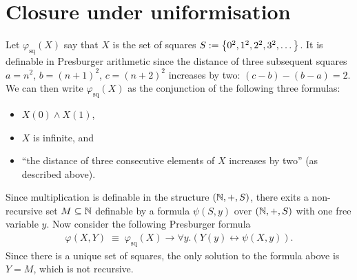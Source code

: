 
\section*{Closure under uniformisation}

\begin{solution}
    Let $\varphi_{\text{sq}}(X)$ say that $X$ is the set of squares $S := \left\{0^2, 1^2, 2^2, 3^2, \dots\right\}$.
    It is definable in Presburger arithmetic since the distance of three subsequent squares
    $a = n^2$, $b = (n+1)^2$, $c = (n+2)^2$ increases by two:
    $(c - b) - (b - a) = 2$.
    We can then write $\varphi_{\text{sq}}(X)$ as the conjunction of the following three formulas:
    \begin{itemize}
        \item $X(0) \land X(1)$,
        \item $X$ is infinite, and
        \item ``the distance of three consecutive elements of $X$ increases by two'' (as described above).
    \end{itemize}
    Since multiplication is definable in the structure $\left( \mathbb N, +, S \right)$,
    there exits a non-recursive set $M \subseteq \mathbb N$
    definable by a formula $\psi(S, y)$ over $\left( \mathbb N, +, S \right)$ with one free variable $y$.
    Now consider the following Presburger formula
    \begin{align*}
        \varphi(X, Y) \;\equiv\; \varphi_{\text{sq}}(X) \to \forall y. (Y(y) \leftrightarrow \psi(X, y)).
    \end{align*}
    Since there is a unique set of squares, the only solution to the formula above is $Y = M$,
    which is not recursive.
\end{solution}

